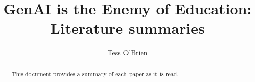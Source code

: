 \documentclass[12pt]{article}
\title{GenAI is the Enemy of Education:\\ Literature summaries}
\author{Tess O'Brien}
\begin{document}
	
	\maketitle
	\begin{abstract}
		This document provides a summary of each paper as it is read.
	\end{abstract}
	
	\paragraph{\cite{barcaui2025chatgpt}}
	
	\paragraph{\cite{budzyn2025endoscopist}}
	
	\paragraph{\cite{facer2021digital}}
	
	\paragraph{\cite{glaser2001knowing}}

	\paragraph{\cite{hogg2026astrophysics}}
	
	\paragraph{\cite{Hogrefe2026GoogleSlides}}
	
	\paragraph{\cite{jarke2019datafication}}
	
	\paragraph{\cite{karamanis2026machines}}
	
	\paragraph{\cite{kosmyna2025brainchatgptaccumulationcognitive}}
	
\end{document}
